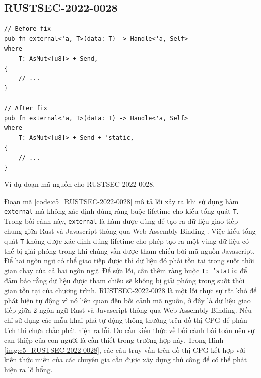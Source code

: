 \subsection{RUSTSEC-2022-0028}

\begin{listing}[H]
\begin{verbatim}
// Before fix
pub fn external<'a, T>(data: T) -> Handle<'a, Self>
where
    T: AsMut<[u8]> + Send,
{
    // ...
}

// After fix
pub fn external<'a, T>(data: T) -> Handle<'a, Self>
where
    T: AsMut<[u8]> + Send + 'static,
{
    // ...
}
\end{verbatim}
\caption{Ví dụ đoạn mã nguồn cho RUSTSEC-2022-0028.}
\label{code:c5_RUSTSEC-2022-0028}
\end{listing}

Đoạn mã \ref{code:c5_RUSTSEC-2022-0028} mô tả lỗi xảy ra khi sử dụng hàm \texttt{external} mà không xác định đúng ràng buộc lifetime cho kiểu tổng quát \texttt{T}.
Trong bối cảnh này, \texttt{external} là hàm được dùng để tạo ra dữ liệu giao tiếp chung giữa Rust và Javascript thông qua Web Assembly Binding \cite{ githubGitHubRustwasmwasmbindgen}.
Việc kiểu tổng quát \texttt{T} không được xác định đúng lifetime cho phép tạo ra một vùng dữ liệu có thể bị giải phóng trong khi chúng vẫn được tham chiếu bởi mã nguồn Javascript.
Để hai ngôn ngữ có thể giao tiếp được thì dữ liệu đó phải tồn tại trong suốt thời gian chạy của cả hai ngôn ngữ.
Để sửa lỗi, cần thêm ràng buộc \texttt{T: 'static} để đảm bảo rằng dữ liệu được tham chiếu sẽ không bị giải phóng trong suốt thời gian tồn tại của chương trình.
RUSTSEC-2022-0028 là một lỗi thực sự rất khó để phát hiện tự động vì nó liên quan đến bối cảnh mã nguồn, ở đây là dữ liệu giao tiếp giữa 2 ngôn ngữ Rust và Javascript thông qua Web Assembly Binding.
Nếu chỉ sử dụng các mẫu khai phá tự động thông thường trên đồ thị CPG để phân tích thì chưa chắc phát hiện ra lỗi.
Do cần kiến thức về bối cảnh bài toán nên sự can thiệp của con người là cần thiết trong trường hợp này.
Trong Hình \ref{img:c5_RUSTSEC-2022-0028}, các câu truy vấn trên đồ thị CPG kết hợp với kiến thức miền của các chuyên gia cần được xây dựng thủ công để có thể phát hiện ra lỗ hổng.

